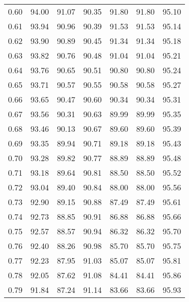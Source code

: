 \begin{tabular}{|c|c|c|c|c|c|c|}
      0.60 &     94.00 &     91.07 &      90.35 &   91.80 &      91.80 &         95.10 \\
      0.61 &     93.94 &     90.96 &      90.39 &   91.53 &      91.53 &         95.14 \\
      0.62 &     93.90 &     90.89 &      90.45 &   91.34 &      91.34 &         95.18 \\
      0.63 &     93.82 &     90.76 &      90.48 &   91.04 &      91.04 &         95.21 \\
      0.64 &     93.76 &     90.65 &      90.51 &   90.80 &      90.80 &         95.24 \\
      0.65 &     93.71 &     90.57 &      90.55 &   90.58 &      90.58 &         95.27 \\
      0.66 &     93.65 &     90.47 &      90.60 &   90.34 &      90.34 &         95.31 \\
      0.67 &     93.56 &     90.31 &      90.63 &   89.99 &      89.99 &         95.35 \\
      0.68 &     93.46 &     90.13 &      90.67 &   89.60 &      89.60 &         95.39 \\
      0.69 &     93.35 &     89.94 &      90.71 &   89.18 &      89.18 &         95.43 \\
      0.70 &     93.28 &     89.82 &      90.77 &   88.89 &      88.89 &         95.48 \\
      0.71 &     93.18 &     89.64 &      90.81 &   88.50 &      88.50 &         95.52 \\
      0.72 &     93.04 &     89.40 &      90.84 &   88.00 &      88.00 &         95.56 \\
      0.73 &     92.90 &     89.15 &      90.88 &   87.49 &      87.49 &         95.61 \\
      0.74 &     92.73 &     88.85 &      90.91 &   86.88 &      86.88 &         95.66 \\
      0.75 &     92.57 &     88.57 &      90.94 &   86.32 &      86.32 &         95.70 \\
      0.76 &     92.40 &     88.26 &      90.98 &   85.70 &      85.70 &         95.75 \\
      0.77 &     92.23 &     87.95 &      91.03 &   85.07 &      85.07 &         95.81 \\
      0.78 &     92.05 &     87.62 &      91.08 &   84.41 &      84.41 &         95.86 \\
      0.79 &     91.84 &     87.24 &      91.14 &   83.66 &      83.66 &         95.93 \\

\end{tabular}
